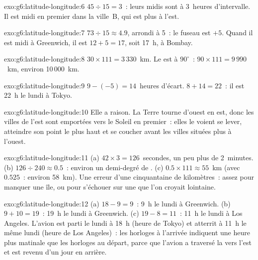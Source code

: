 \begin{solution}{exo:g6:latitude-longitude:6}
$45 \div 15 = 3$~: leurs midis sont à 3~heures d'intervalle. Il est midi
en premier dans la ville~B, qui est plus à l'est.
\end{solution}

\begin{solution}{exo:g6:latitude-longitude:7}
$73 \div 15 \approx 4.9$, arrondi à 5~: le fuseau est $+5$. Quand il est
midi à Greenwich, il est $12 + 5 = 17$, soit 17~h, à Bombay.
\end{solution}

\begin{solution}{exo:g6:latitude-longitude:8}
$30 \times 111 = 3\,330$~km. Le  est à $90^\circ$~:
$90 \times 111 = 9\,990$~km, environ 10\,000~km.
\end{solution}

\begin{solution}{exo:g6:latitude-longitude:9}
$9 - (-5) = 14$~heures d'écart. $8 + 14 = 22$~: il est 22~h le lundi à
Tokyo.
\end{solution}

\begin{solution}{exo:g6:latitude-longitude:10}
Elle a raison. La Terre tourne d'ouest en est, donc les villes de l'est
sont emportées vers le Soleil en premier~: elles le voient se lever,
atteindre son point le plus haut et se coucher avant les villes situées
plus à l'ouest.
\end{solution}

\begin{solution}{exo:g6:latitude-longitude:11}
(a) $42 \times 3 = 126$~secondes, un peu plus de 2~minutes. (b)
$126 \div 240 \approx 0.5$~: environ un demi-degré de . (c)
$0.5 \times 111 \approx 55$~km (avec $0.525$~: environ 58~km). Une erreur
d'une cinquantaine de kilomètres~: assez pour manquer une île, ou pour
s'échouer sur une  que l'on croyait lointaine.
\end{solution}

\begin{solution}{exo:g6:latitude-longitude:12}
(a) $18 - 9 = 9$~: 9~h le lundi à Greenwich. (b) $9 + 10 = 19$~: 19~h le
lundi à Greenwich. (c) $19 - 8 = 11$~: 11~h le lundi à Los Angeles. L'avion
est parti le lundi à 18~h (heure de Tokyo) et atterrit à 11~h le même lundi
(heure de Los Angeles)~: les horloges à l'arrivée indiquent une heure plus
matinale que les horloges au départ, parce que l'avion a traversé la  vers l'est et est revenu d'un jour en arrière.
\end{solution}

